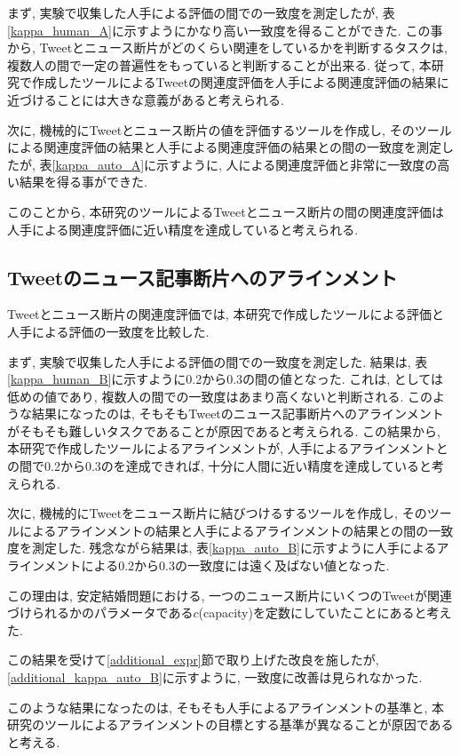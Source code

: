 \documentclass[12pt]{jarticle}
\begin{document}
まず, 実験で収集した人手による評価の間での一致度を測定したが, 表\ref{kappa_human_A}に示すようにかなり高い一致度を得ることができた. 
この事から, Tweetとニュース断片がどのくらい関連をしているかを判断するタスクは, 複数人の間で一定の普遍性をもっていると判断することが出来る. 
従って, 本研究で作成したツールによるTweetの関連度評価を人手による関連度評価の結果に近づけることには大きな意義があると考えられる. 

次に, 機械的にTweetとニュース断片の値を評価するツールを作成し, そのツールによる関連度評価の結果と人手による関連度評価の結果との間の一致度を測定したが, 表\ref{kappa_auto_A}に示すように, 人による関連度評価と非常に一致度の高い結果を得る事ができた. 

このことから, 本研究のツールによるTweetとニュース断片の間の関連度評価は人手による関連度評価に近い精度を達成していると考えられる. 

\subsection{Tweetのニュース記事断片へのアラインメント}
Tweetとニュース断片の関連度評価では, 本研究で作成したツールによる評価と人手による評価の一致度を比較した. 

まず, 実験で収集した人手による評価の間での一致度を測定した. 結果は, 表\ref{kappa_human_B}に示すように0.2から0.3の間の値となった. 
これは, \kappac としては低めの値であり, 複数人の間での一致度はあまり高くないと判断される. 
このような結果になったのは, そもそもTweetのニュース記事断片へのアラインメントがそもそも難しいタスクであることが原因であると考えられる. 
この結果から, 本研究で作成したツールによるアラインメントが, 人手によるアラインメントとの間で0.2から0.3の\kappac を達成できれば, 十分に人間に近い精度を達成していると考えられる. 

次に, 機械的にTweetをニュース断片に結びつけるするツールを作成し, そのツールによるアラインメントの結果と人手によるアラインメントの結果との間の一致度を測定した. 残念ながら結果は, 表\ref{kappa_auto_B}に示すように人手によるアラインメントによる0.2から0.3の一致度には遠く及ばない値となった. 

この理由は, 安定結婚問題における, 一つのニュース断片にいくつのTweetが関連づけられるかのパラメータである$c$(capacity)を定数にしていたことにあると考えた. 

この結果を受けて\ref{additional_expr}節で取り上げた改良を施したが, \ref{additional_kappa_auto_B}に示すように, 一致度に改善は見られなかった. 

このような結果になったのは, そもそも人手によるアラインメントの基準と, 本研究のツールによるアラインメントの目標とする基準が異なることが原因であると考える. 
\end{document}

